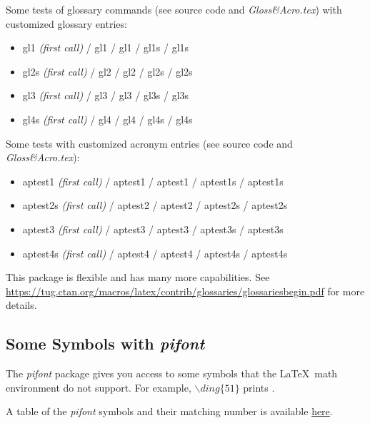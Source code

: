 \noindent Some tests of glossary commands (see source code and \textit{Gloss\&Acro.tex}) with customized glossary entries:
\begin{itemize}
    \item \gls{gl1} \textit{(first call)} / \gls{gl1} / \Gls{gl1} / \glspl{gl1} / \Glspl{gl1}
    \item \glspl{gl2} \textit{(first call)} / \gls{gl2} / \Gls{gl2} / \glspl{gl2} / \Glspl{gl2}
    \item \Gls{gl3} \textit{(first call)} / \gls{gl3} / \Gls{gl3} / \glspl{gl3} / \Glspl{gl3}
    \item \Glspl{gl4} \textit{(first call)} / \gls{gl4} / \Gls{gl4} / \glspl{gl4} / \Glspl{gl4}
\end{itemize}

\bigskip

\noindent Some tests with customized acronym entries (see source code and \textit{Gloss\&Acro.tex}):
\begin{itemize}
    \item \gls{aptest1} \textit{(first call)} / \gls{aptest1} / \Gls{aptest1} / \glspl{aptest1} / \Glspl{aptest1}
    \item \glspl{aptest2} \textit{(first call)} / \gls{aptest2} / \Gls{aptest2} / \glspl{aptest2} / \Glspl{aptest2}
    \item \Gls{aptest3} \textit{(first call)} / \gls{aptest3} / \Gls{aptest3} / \glspl{aptest3} / \Glspl{aptest3}
    \item \Glspl{aptest4} \textit{(first call)} / \gls{aptest4} / \Gls{aptest4} / \glspl{aptest4} / \Glspl{aptest4}
\end{itemize}

\bigskip

\noindent This package is flexible and has many more capabilities. See \url{https://tug.ctan.org/macros/latex/contrib/glossaries/glossariesbegin.pdf} for more details.

\subsection{Some Symbols with \textit{pifont}}

The \textit{pifont} package gives you access to some symbols that the \LaTeX~math environment do not support. For example, $\backslash ding \{ 51 \}$ prints .

\noindent A table of the \textit{pifont} symbols and their matching number is available \href{https://dl.icdst.org/pdfs/files3/1900293ae8829c4c53fe55f2c9f0077c.pdf}{here}.


